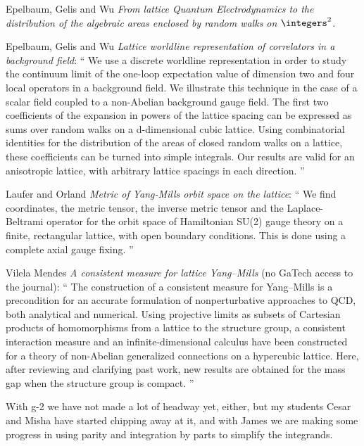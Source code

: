 \begin{description}
Epelbaum, Gelis and Wu
{\em From lattice Quantum Electrodynamics to the distribution of
    the algebraic areas enclosed by random walks on $\integers^2$}.


Epelbaum, Gelis and Wu
{\em Lattice worldline representation of correlators in a background field}: ``
We use a discrete worldline representation in order to study the continuum
limit of the one-loop expectation value of dimension two and four local
operators in a background field. We illustrate this technique in the case of
a scalar field coupled to a non-Abelian background gauge field. The first two
coefficients of the expansion in powers of the lattice spacing can be
expressed as sums over random walks on a d-dimensional cubic lattice. Using
combinatorial identities for the distribution of the areas of closed random
walks on a lattice, these coefficients can be turned into simple integrals.
Our results are valid for an anisotropic lattice, with arbitrary lattice
spacings in each direction.
''

Laufer and Orland
{\em Metric of {Yang-Mills} orbit space on the lattice}: ``
We find coordinates, the metric tensor, the inverse metric tensor and the
Laplace-Beltrami operator for the orbit space of Hamiltonian SU(2) gauge
theory on a finite, rectangular lattice, with open boundary conditions. This
is done using a complete axial gauge fixing.
''

Vilela Mendes {\em A consistent measure for lattice Yang–Mills}
(no GaTech access to the journal): ``
The construction of a consistent measure for Yang–Mills is a precondition for
an accurate formulation of nonperturbative approaches to QCD, both analytical
and numerical. Using projective limits as subsets of Cartesian products of
homomorphisms from a lattice to the structure group, a consistent interaction
measure and an infinite-dimensional calculus have been constructed for a
theory of non-Abelian generalized connections on a hypercubic lattice. Here,
after reviewing and clarifying past work, new results are obtained for the
mass gap when the structure group is compact.
''



\item[2017-09-19 Schubert]
With g-2 we have not made a lot of headway yet, either, but my students Cesar
and Misha have started chipping away at it,  and with James we are making
some progress in using parity and integration by parts to simplify the
integrands.


\end{description}
